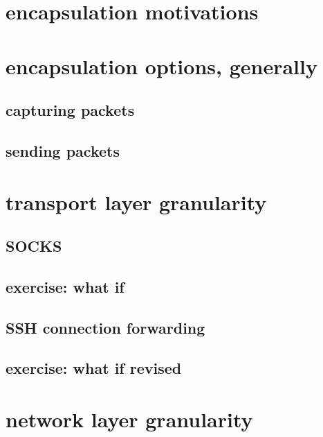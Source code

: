 
\section{encapsulation motivations}



\section{encapsulation options, generally}



\subsection{capturing packets}


\subsection{sending packets}

\section{transport layer granularity}

\subsection{SOCKS}


\subsection{exercise: what if}


\subsection{SSH connection forwarding}


\subsection{exercise: what if revised}


\section{network layer granularity}


